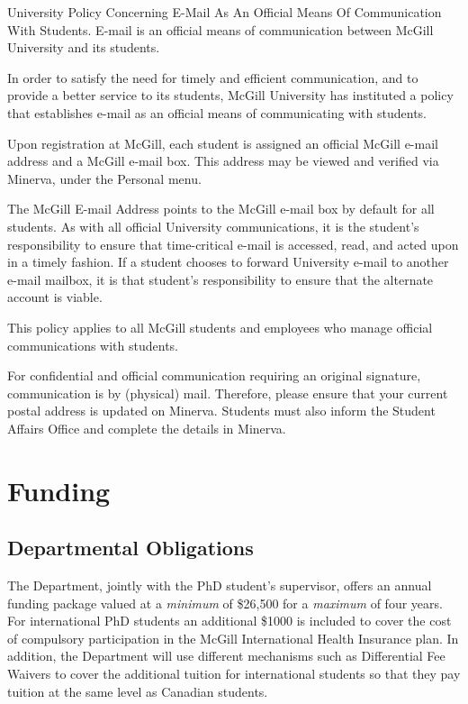 \documentclass[
  openany]{book}
\begin{document}
University Policy Concerning E-Mail As An Official Means Of Communication With Students. E-mail is an official means of communication between McGill University and its students.

In order to satisfy the need for timely and efficient communication, and to provide a better service to its students, McGill University has instituted a policy that establishes e-mail as an official means of communicating with students.

Upon registration at McGill, each student is assigned an official McGill e-mail address and a McGill e-mail box. This address may be viewed and verified via Minerva, under the Personal menu.

The McGill E-mail Address points to the McGill e-mail box by default for all students. As with all official University communications, it is the student's responsibility to ensure that time-critical e-mail is accessed, read, and acted upon in a timely fashion. If a student chooses to forward University e-mail to another e-mail mailbox, it is that student's responsibility to ensure that the alternate account is viable.

This policy applies to all McGill students and employees who manage official communications with students.

For confidential and official communication requiring an original signature, communication is by (physical) mail. Therefore, please ensure that your current postal address is updated on Minerva. Students must also inform the Student Affairs Office and complete the details in Minerva.

\hypertarget{funding}{%
\chapter{Funding}\label{funding}}

\hypertarget{departmental-obligations}{%
\section{Departmental Obligations}\label{departmental-obligations}}

The Department, jointly with the PhD student's supervisor, offers an annual funding package valued at a \emph{minimum} of \$26,500 for a \emph{maximum} of four years. For international PhD students an additional \$1000 is included to cover the cost of compulsory participation in the McGill International Health Insurance plan. In addition, the Department will use different mechanisms such as Differential Fee Waivers to cover the additional tuition for international students so that they pay tuition at the same level as Canadian students.
\end{document}

